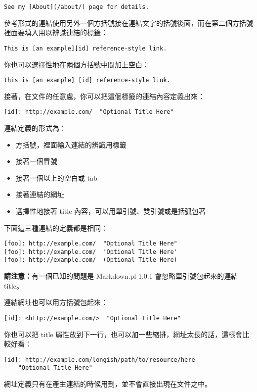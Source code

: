 \begin{verbatim}
See my [About](/about/) page for details.   
\end{verbatim}
參考形式的連結使用另外一個方括號接在連結文字的括號後面，而在第二個方括號裡面要填入用以辨識連結的標籤：

\begin{verbatim}
This is [an example][id] reference-style link.
\end{verbatim}
你也可以選擇性地在兩個方括號中間加上空白：

\begin{verbatim}
This is [an example] [id] reference-style link.
\end{verbatim}
接著，在文件的任意處，你可以把這個標籤的連結內容定義出來：

\begin{verbatim}
[id]: http://example.com/  "Optional Title Here"
\end{verbatim}
連結定義的形式為：

\begin{itemize}
\item
  方括號，裡面輸入連結的辨識用標籤
\item
  接著一個冒號
\item
  接著一個以上的空白或 tab
\item
  接著連結的網址
\item
  選擇性地接著 title 內容，可以用單引號、雙引號或是括弧包著
\end{itemize}
下面這三種連結的定義都是相同：

\begin{verbatim}
[foo]: http://example.com/  "Optional Title Here"
[foo]: http://example.com/  'Optional Title Here'
[foo]: http://example.com/  (Optional Title Here)
\end{verbatim}
\textbf{請注意：}有一個已知的問題是 Markdown.pl 1.0.1
會忽略單引號包起來的連結 title。

連結網址也可以用方括號包起來：

\begin{verbatim}
[id]: <http://example.com/>  "Optional Title Here"
\end{verbatim}
你也可以把 title
屬性放到下一行，也可以加一些縮排，網址太長的話，這樣會比較好看：

\begin{verbatim}
[id]: http://example.com/longish/path/to/resource/here
    "Optional Title Here"
\end{verbatim}
網址定義只有在產生連結的時候用到，並不會直接出現在文件之中。

